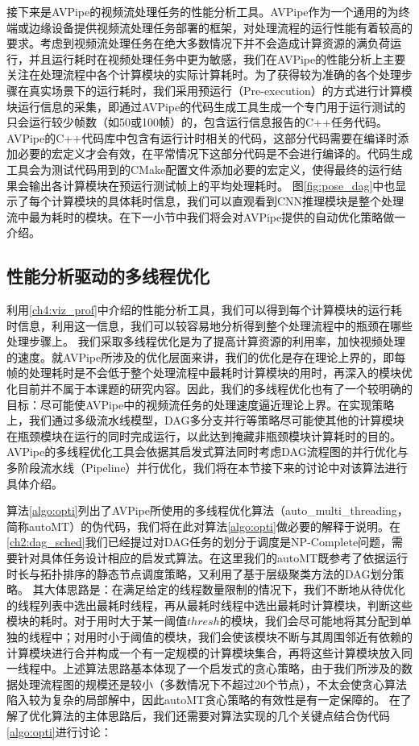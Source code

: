 接下来是AVPipe的视频流处理任务的性能分析工具。AVPipe作为一个通用的为终端或边缘设备提供视频流处理任务部署的框架，对处理流程的运行性能有着较高的要求。考虑到视频流处理任务在绝大多数情况下并不会造成计算资源的满负荷运行，并且运行耗时在视频处理任务中更为敏感，我们在AVPipe的性能分析上主要关注在处理流程中各个计算模块的实际计算耗时。为了获得较为准确的各个处理步骤在真实场景下的运行耗时，我们采用预运行（Pre-execution\cite{kim2002design}）的方式进行计算模块运行信息的采集，即通过AVPipe的代码生成工具生成一个专门用于运行测试的只会运行较少帧数（如50或100帧）的，包含运行信息报告的C++任务代码。AVPipe的C++代码库中包含有运行计时相关的代码，这部分代码需要在编译时添加必要的宏定义才会有效，在平常情况下这部分代码是不会进行编译的。代码生成工具会为测试代码用到的CMake配置文件添加必要的宏定义，使得最终的运行结果会输出各计算模块在预运行测试帧上的平均处理耗时。
图\ref{fig:pose_dag}中也显示了每个计算模块的具体耗时信息，我们可以直观看到CNN推理模块是整个处理流中最为耗时的模块。在下一小节中我们将会对AVPipe提供的自动优化策略做一介绍。


\subsection{性能分析驱动的多线程优化}
利用\ref{ch4:viz_prof}中介绍的性能分析工具，我们可以得到每个计算模块的运行耗时信息，利用这一信息，我们可以较容易地分析得到整个处理流程中的瓶颈在哪些处理步骤上。
我们采取多线程优化是为了提高计算资源的利用率，加快视频处理的速度。就AVPipe所涉及的优化层面来讲，我们的优化是存在理论上界的，即每帧的处理耗时是不会低于整个处理流程中最耗时计算模块的用时，再深入的模块优化目前并不属于本课题的研究内容。因此，我们的多线程优化也有了一个较明确的目标：尽可能使AVPipe中的视频流任务的处理速度逼近理论上界。在实现策略上，我们通过多级流水线模型，DAG多分支并行等策略尽可能使其他的计算模块在瓶颈模块在运行的同时完成运行，以此达到掩藏非瓶颈模块计算耗时的目的。
AVPipe的多线程优化工具会依据其启发式算法同时考虑DAG流程图的并行优化与多阶段流水线（Pipeline）并行优化，我们将在本节接下来的讨论中对该算法进行具体介绍。\par

算法\ref{algo:opti}列出了AVPipe所使用的多线程优化算法（auto\_multi\_threading，简称autoMT）的伪代码，我们将在此对算法\ref{algo:opti}做必要的解释于说明。在\ref{ch2:dag_sched}我们已经提过对DAG任务的划分于调度是NP-Complete问题，需要针对具体任务设计相应的启发式算法。在这里我们的autoMT既参考了依据运行时长与拓扑排序的静态节点调度策略，又利用了基于层级聚类方法的DAG划分策略。
其大体思路是：在满足给定的线程数量限制的情况下，我们不断地从待优化的线程列表中选出最耗时线程，再从最耗时线程中选出最耗时计算模块，判断这些模块的耗时。对于用时大于某一阈值$thresh$的模块，我们会尽可能地将其分配到单独的线程中；对用时小于阈值的模块，我们会使该模块不断与其周围邻近有依赖的计算模块进行合并构成一个有一定规模的计算模块集合，再将这些计算模块放入同一线程中。上述算法思路基本体现了一个启发式的贪心策略，由于我们所涉及的数据处理流程图的规模还是较小（多数情况下不超过20个节点），不太会使贪心算法陷入较为复杂的局部解中，因此autoMT贪心策略的有效性是有一定保障的。
在了解了优化算法的主体思路后，我们还需要对算法实现的几个关键点结合伪代码\ref{algo:opti}进行讨论：


